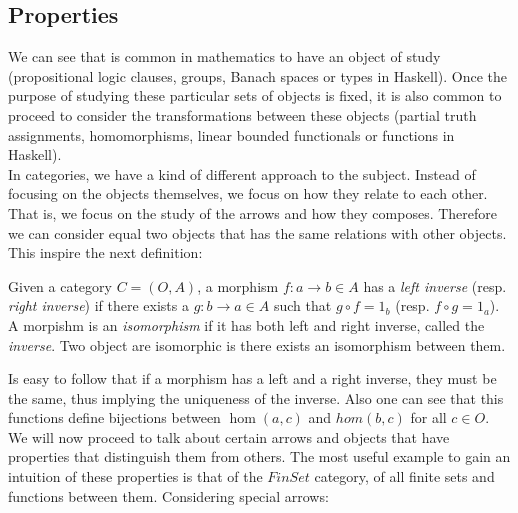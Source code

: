 \subsection{Properties}

We can see that is common in mathematics to have an object of study (propositional logic clauses, groups, Banach spaces or types in Haskell). Once the purpose of studying these particular sets of objects is fixed, it is also common to proceed to consider the transformations between these objects (partial truth assignments, homomorphisms, linear bounded functionals or  functions in Haskell).\\

In categories, we have a kind of different approach to the subject. Instead of focusing on the objects themselves, we focus on how they relate to each other. That is, we focus on the study of the arrows and how they composes. Therefore we can consider equal two objects that has the same relations with other objects. This inspire the next definition:

\begin{definition}\cite[Definition 1.1.9]{riehl2017category}
  Given a category $C=(O,A)$, a morphism $f: a \to b \in A$ has a \emph{left inverse} (resp. \emph{right inverse}) if there exists a $g: b \to a \in A$ such that $g \circ f = 1_b$ (resp. $f \circ g = 1_a$). A morpishm is an \emph{isomorphism} if it has both left and right inverse, called the \emph{inverse}. Two object are isomorphic is there exists an isomorphism between them.
\end{definition}


Is easy to follow that if a morphism has a left and a right inverse, they must be the same, thus implying the uniqueness of the inverse. Also one can see that this functions define bijections between $\hom(a,c)$ and $hom(b,c)$ for all $c\in O$.\\


We will now proceed to talk about certain arrows and objects that have properties that distinguish them from others.  The most useful example to gain an intuition of these properties is that of the $FinSet$ category, of all finite sets and functions between them.  Considering special arrows:\\

